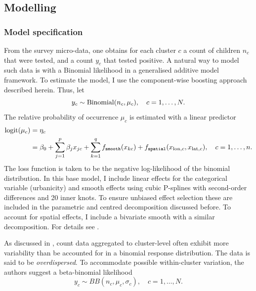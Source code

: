 \subsection{Modelling}

\subsubsection*{Model specification}

From the survey micro-data, one obtains for each cluster $c$ a count of children $n_c$ that were tested, and a count $y_c$ that tested positive. A natural way to model such data is with a Binomial likelihood in a generalised additive model framework. To estimate the model, I use the component-wise boosting approach described herein. Thus, let
\begin{equation*}
	y_c \sim \operatorname{Binomial}(n_c, \mu_c), \quad c = 1, \dots, N.
\end{equation*}  
The relative probability of occurrence $\mu_c$ is estimated with a linear predictor 
\begin{align}\label{eq:mli_main}
	\begin{split}
	\operatorname{logit}(\mu_c)   &= \eta_c \\
	                &= \beta_0  + \sum_{j = 1}^{p} \beta_j x_{jc} + \sum_{k = 1}^{q} f_{\mathtt{smooth}} (x_{kc}) + f_{\mathtt{spatial}} (x_{\text{lon}, c}, x_{\text{lat}, c}), \quad c = 1, \dots, n.
	\end{split}
\end{align}
The loss function is taken to be the negative log-likelihood of the binomial distribution. In this base model, I include linear effects for the categorical variable (urbanicity) and smooth effects using cubic P-splines with second-order differences and 20 inner knots. To ensure unbiased effect selection these are included in the parametric and centred decomposition discussed before. To account for spatial effects, I include a bivariate smooth with a similar decomposition. For details see \textcite{kneibVariableSelectionModel2009}.

As discussed in \textcite{dongModelingPresentationVaccination2021}, count data aggregated to cluster-level often exhibit more variability than be accounted for in a binomial response distribution. The data is said to be \textit{overdispersed}. To accommodate possible within-cluster variation, the authors suggest a beta-binomial likelihood
\begin{equation*}
	y_c \sim BB(n_c, \mu_c, \sigma_c), \quad c = 1, \dots, N.
\end{equation*} 

